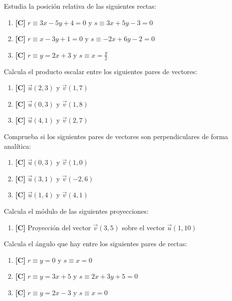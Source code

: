 \Exercicio Estudia la posición relativa de las siguientes rectas:

\begin{enumerate}[topsep=0pt]
	\item \textbf{[C]} $r \equiv 3x-5y+ 4 = 0 $ y $s \equiv 3x+ 5y-3 = 0 $
	\item \textbf{[C]} $r \equiv x-3y+ 1 = 0$ y $s \equiv -2x+ 6y-2 = 0$
	\item \textbf{[C]} $r \equiv y = 2x+ 3$ y $s \equiv x= \frac{y}{2}$
\end{enumerate}


\Exercicio Calcula el producto escalar entre los siguientes pares de vectores:

\begin{enumerate}[topsep=0pt]
\item \textbf{[C]} $ \vec{u}(2,3)$ y $\vec{v}(1,7) $
	\item \textbf{[C]} $ \vec{u}(0,3)$ y $\vec{v}(1,8) $
	\item \textbf{[C]} $ \vec{u}(4,1)$ y $\vec{v}(2,7) $
\end{enumerate}


\Exercicio Comprueba si los siguientes pares de vectores son perpendiculares de forma analítica:

\begin{enumerate}[topsep=0pt]
\item \textbf{[C]} $ \vec{u}(0,3)$ y $\vec{v}(1,0) $
	\item \textbf{[C]} $ \vec{u}(3,1)$ y $\vec{v}(-2,6) $
	\item \textbf{[C]} $ \vec{u}(1,4)$ y $\vec{v}(4,1) $
\end{enumerate}


\Exercicio Calcula el módulo de las siguientes proyecciones:

\begin{enumerate}[topsep=0pt]
\item \textbf{[C]} Proyección del vector $\vec{v}(3,5)$ sobre el vector $\vec{u}(1,10)$
\end{enumerate}


\Exercicio Calcula el ángulo que hay entre los siguientes pares de rectas:

\begin{enumerate}[topsep=0pt]
\item \textbf{[C]} $ r \equiv y = 0 $ y $ s \equiv x = 0 $
	\item \textbf{[C]} $ r \equiv y = 3x + 5  $ y $ s \equiv 2x + 3y +5 = 0 $
	\item \textbf{[C]} $ r \equiv y = 2x - 3  $ y $ s \equiv x = 0 $
\end{enumerate}


